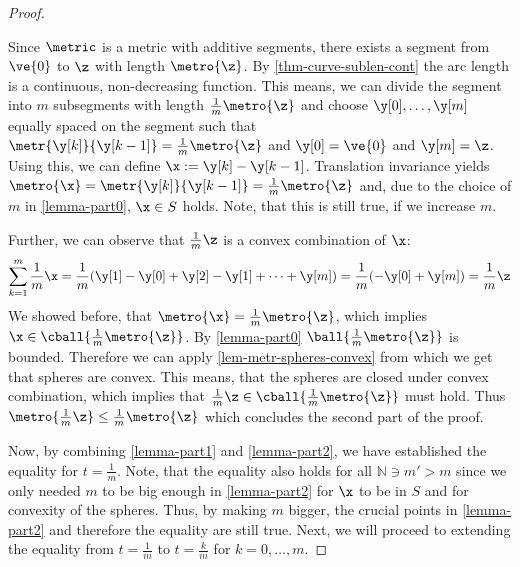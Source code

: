 \begin{proof}

	\begin{proofpart}[$t \metro{\z} \geq \metro{t \z}$ for $t = \frac{1}{m} < d$ with $m \in \mathbb{N}$] \label{lemma-part2}
    Since $\metric$ is a metric with additive segments, there exists a segment from $\ve{0}$ to $\z$ with length $\metro{\z}$. By \cref{thm-curve-sublen-cont} the arc length is a continuous, non-decreasing function. This means, we can divide the segment into $m$ subsegments with length $\frac{1}{m} \metro{\z}$ and choose $\y[0], \dots, \y[m]$ equally spaced on the segment such that $\metr{\y[k]}{\y[k-1]} = \frac{1}{m} \metro{\z}$ and $\y[0] = \ve{0}$ and $\y[m] = \z$.
		Using this, we can define $\x := \y[k] - \y[k-1]$. Translation invariance yields $\metro{\x} =\metr{\y[k]}{\y[k-1]} = \frac{1}{m} \metro{\z}$ and, due to the choice of $m$ in \cref{lemma-part0},  $\x \in S$ holds. Note, that this is still true, if we increase $m$.

		Further, we can observe that $\frac{1}{m} \z$ is a convex combination of $\x$:
		$$\sum_{k=1}^m \frac{1}{m} \x = \frac{1}{m} (\y[1] - \y[0] + \y[2] - \y[1] + \dots + \y[m]) = \frac{1}{m} (-\y[0] + \y[m]) = \frac{1}{m} \z$$
		We showed before, that $\metro{\x} = \frac{1}{m}\metro{\z}$, which implies $\x \in  \cball{\frac{1}{m}\metro{\z}}$.
		By \cref{lemma-part0} $\ball{\frac{1}{m} \metro{\z}}$ is bounded. Therefore we can apply \cref{lem-metr-spheres-convex} from which we get that spheres are convex. This means, that the spheres are closed under convex combination, which implies that $\frac{1}{m} \z \in \cball{\frac{1}{m} \metro{\z}}$ must hold. Thus $\metro{\frac1m \z} \leq \frac1m \metro{\z}$ which concludes the second part of the proof.
	\end{proofpart}


	Now, by combining \cref{lemma-part1} and \cref{lemma-part2}, we have established the equality for $t = \frac{1}{m}$. Note, that the equality also holds for all $\mathbb{N} \ni m' > m$ since we only needed $m$ to be big enough in \cref{lemma-part2} for $\x$ to be in $S$ and for convexity of the spheres. Thus, by making $m$ bigger, the crucial points in \cref{lemma-part2} and therefore the equality are still true.
	Next, we will proceed to extending the equality from $t = \frac{1}{m}$ to $t =\frac{k}{m}$ for $k = 0, \dots, m$.





\end{proof}

